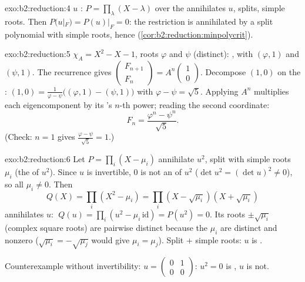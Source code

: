 \begin{solution}{exo:b2:reduction:4}
$u$ : $P = \prod_{\lambda}(X - \lambda)$ over the
 annihilates $u$, splits, simple roots. Then $P(u|_F) =
P(u)|_F = 0$: the restriction is annihilated by a split polynomial
with simple roots, hence 
(\cref{cor:b2:reduction:minpolycrit}).
\end{solution}

\begin{solution}{exo:b2:reduction:5}
$\chi_A = X^2 - X - 1$, roots $\varphi$ and $\psi$ (distinct):
, with  $(\varphi, 1)$ and $(\psi, 1)$.
The recurrence gives $\begin{pmatrix} F_{n+1}\\ F_n \end{pmatrix} =
A^n \begin{pmatrix}1\\ 0\end{pmatrix}$. Decompose $(1, 0)$ on the
: $(1,0) = \frac{1}{\varphi - \psi}\bigl((\varphi, 1) -
(\psi, 1)\bigr)$ with $\varphi - \psi = \sqrt5$. Applying $A^n$
multiplies each eigencomponent by its 's $n$-th power;
reading the second coordinate:
\[
F_n = \frac{\varphi^n - \psi^n}{\sqrt 5} .
\]
(Check: $n = 1$ gives $\frac{\varphi - \psi}{\sqrt5} = 1$.)
\end{solution}

\begin{solution}{exo:b2:reduction:6}
Let $P = \prod_i (X - \mu_i)$ annihilate $u^2$, split with simple
roots $\mu_i$ (the  of $u^2$). Since $u$ is invertible, $0$
is not an  of $u^2$ ($\det u^2 = (\det u)^2 \neq 0$), so
all $\mu_i \neq 0$. Then
\[
Q(X) = \prod_i (X^2 - \mu_i) = \prod_i (X - \sqrt{\mu_i})(X +
\sqrt{\mu_i})
\]
annihilates $u$: $\;Q(u) = \prod_i (u^2 - \mu_i\,\mathrm{id}) =
P(u^2) = 0$. Its roots $\pm
\sqrt{\mu_i}$ (complex square roots) are pairwise distinct because
the $\mu_i$ are distinct and nonzero ($\sqrt{\mu_i} = -\sqrt{\mu_j}$
would give $\mu_i = \mu_j$). Split + simple roots: $u$ is
.

Counterexample without invertibility: $u = \begin{pmatrix} 0 & 1\\
0 & 0\end{pmatrix}$: $u^2 = 0$ is , $u$ is not.
\end{solution}

